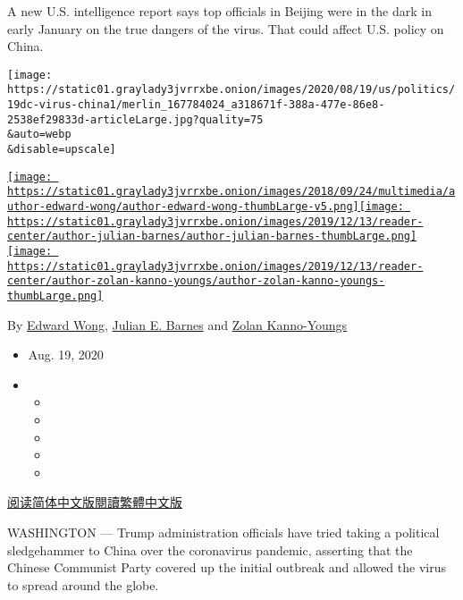 A new U.S. intelligence report says top officials in Beijing were in the
dark in early January on the true dangers of the virus. That could
affect U.S. policy on China.

\texttt{[image: https://static01.graylady3jvrrxbe.onion/images/2020/08/19/us/politics/19dc-virus-china1/merlin\_167784024\_a318671f-388a-477e-86e8-2538ef29833d-articleLarge.jpg?quality=75\\\&auto=webp\\\&disable=upscale]}

\href{https://www.nytimes3xbfgragh.onion/by/edward-wong}{\texttt{[image: https://static01.graylady3jvrrxbe.onion/images/2018/09/24/multimedia/author-edward-wong/author-edward-wong-thumbLarge-v5.png]}}\href{https://www.nytimes3xbfgragh.onion/by/julian-e-barnes}{\texttt{[image: https://static01.graylady3jvrrxbe.onion/images/2019/12/13/reader-center/author-julian-barnes/author-julian-barnes-thumbLarge.png]}}\href{https://www.nytimes3xbfgragh.onion/by/zolan-kanno-youngs}{\texttt{[image: https://static01.graylady3jvrrxbe.onion/images/2019/12/13/reader-center/author-zolan-kanno-youngs/author-zolan-kanno-youngs-thumbLarge.png]}}

By \href{https://www.nytimes3xbfgragh.onion/by/edward-wong}{Edward
Wong},
\href{https://www.nytimes3xbfgragh.onion/by/julian-e-barnes}{Julian E.
Barnes} and
\href{https://www.nytimes3xbfgragh.onion/by/zolan-kanno-youngs}{Zolan
Kanno-Youngs}

\begin{itemize}
\item
  Aug. 19, 2020
\item
  \begin{itemize}
  \item
  \item
  \item
  \item
  \item
  \end{itemize}
\end{itemize}

\href{https://cn.nytimes3xbfgragh.onion/asia-pacific/20200820/china-coronavirus-beijing-trump/}{阅读简体中文版}\href{https://cn.nytimes3xbfgragh.onion/asia-pacific/20200820/china-coronavirus-beijing-trump/zh-hant/}{閱讀繁體中文版}

WASHINGTON --- Trump administration officials have tried taking a
political sledgehammer to China over the coronavirus pandemic, asserting
that the Chinese Communist Party covered up the initial outbreak and
allowed the virus to spread around the globe.

